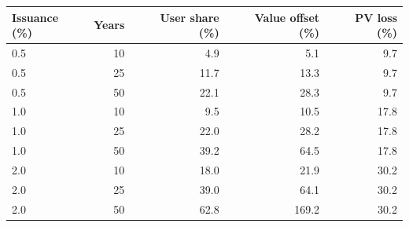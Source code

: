 \begin{tabular}{@{}lrrrr@{}}
\toprule
Issuance (\%) & Years & User share (\%) & Value offset (\%) & PV loss (\%) \\
\midrule
0.5 & 10 & 4.9 & 5.1 & 9.7 \\
0.5 & 25 & 11.7 & 13.3 & 9.7 \\
0.5 & 50 & 22.1 & 28.3 & 9.7 \\
1.0 & 10 & 9.5 & 10.5 & 17.8 \\
1.0 & 25 & 22.0 & 28.2 & 17.8 \\
1.0 & 50 & 39.2 & 64.5 & 17.8 \\
2.0 & 10 & 18.0 & 21.9 & 30.2 \\
2.0 & 25 & 39.0 & 64.1 & 30.2 \\
2.0 & 50 & 62.8 & 169.2 & 30.2 \\
\bottomrule
\end{tabular}
